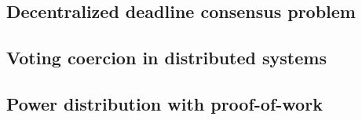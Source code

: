 \subsection{Decentralized deadline consensus problem}

\subsection{Voting coercion in distributed systems}



\subsection{Power distribution with proof-of-work}
